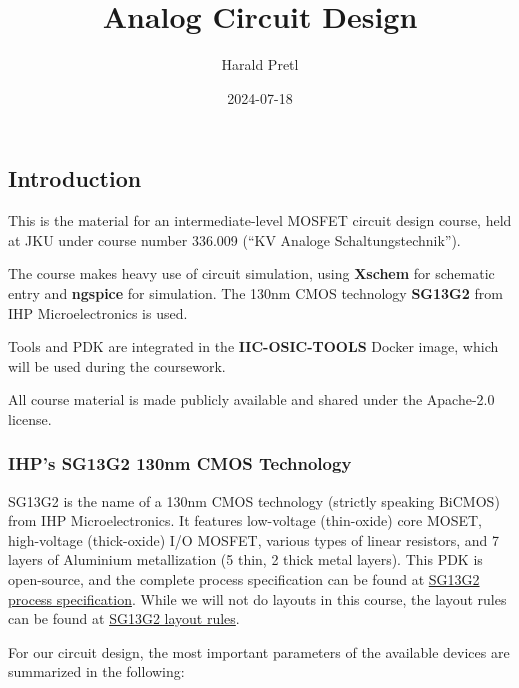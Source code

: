 \documentclass[
  letterpaper,
  DIV=11,
  numbers=noendperiod]{scrartcl}
\title{Analog Circuit Design}
\author{Harald Pretl}
\date{2024-07-18}
\renewcommand*\contentsname{Table of contents}
\newcommand\contentsname{Table of contents}
\begin{document}
\maketitle

\renewcommand*\contentsname{Table of contents}
{
\hypersetup{linkcolor=}
\setcounter{tocdepth}{3}
\tableofcontents
}

\subsection{Introduction}\label{sec-intro}

This is the material for an intermediate-level MOSFET circuit design
course, held at JKU under course number 336.009 (``KV Analoge
Schaltungstechnik'').

The course makes heavy use of circuit simulation, using \textbf{Xschem}
for schematic entry and \textbf{ngspice} for simulation. The 130nm CMOS
technology \textbf{SG13G2} from IHP Microelectronics is used.

Tools and PDK are integrated in the \textbf{IIC-OSIC-TOOLS} Docker
image, which will be used during the coursework.

All course material is made publicly available and shared under the
Apache-2.0 license.

\subsubsection{IHP's SG13G2 130nm CMOS
Technology}\label{ihps-sg13g2-130nm-cmos-technology}

SG13G2 is the name of a 130nm CMOS technology (strictly speaking BiCMOS)
from IHP Microelectronics. It features low-voltage (thin-oxide) core
MOSET, high-voltage (thick-oxide) I/O MOSFET, various types of linear
resistors, and 7 layers of Aluminium metallization (5 thin, 2 thick
metal layers). This PDK is open-source, and the complete process
specification can be found at
\href{https://github.com/IHP-GmbH/IHP-Open-PDK/blob/main/ihp-sg13g2/libs.doc/doc/SG13G2_os_process_spec.pdf}{SG13G2
process specification}. While we will not do layouts in this course, the
layout rules can be found at
\href{https://github.com/IHP-GmbH/IHP-Open-PDK/blob/main/ihp-sg13g2/libs.doc/doc/SG13G2_os_layout_rules.pdf}{SG13G2
layout rules}.

For our circuit design, the most important parameters of the available
devices are summarized in the following:
\end{document}
